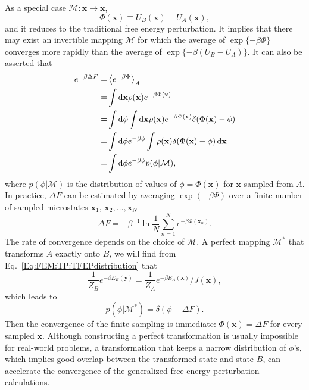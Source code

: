 As a special case $\mathcal{M}: \mathbf{x} \to\mathbf{x}$,
\begin{equation}
	\Phi(\mathbf{x})\equiv U_B(\mathbf{x})-U_A(\mathbf{x}),
\end{equation}
and it reduces to the traditional free energy perturbation. It implies that there may exist an invertible mapping $\mathcal{M}$ for which the average of $\exp\{-\beta \Phi\}$ converges more rapidly than the average of $\exp\{-\beta (U_B-U_A)\}$. It can also be asserted that
\begin{align}
	e^{-\beta \Delta F}=&\left<e^{-\beta \Phi}\right>_A\notag\\
	                =&\int \mathop{}\!\mathrm{d} \mathbf{x} \rho(\mathbf{x})e^{-\beta \Phi(\mathbf{x})}\notag\\
	                =&\int \mathop{}\!\mathrm{d}\phi \int \mathop{}\!\mathrm{d} \mathbf{x} \rho(\mathbf{x})e^{-\beta \Phi(\mathbf{x})}\delta(\Phi(\mathbf{x})-\phi)\notag\\
	                =&\int \mathop{}\!\mathrm{d}\phi e^{-\beta \phi}\int \rho(\mathbf{x})\delta(\Phi(\mathbf{x})-\phi)\mathop{}\!\mathrm{d} \mathbf{x}\notag\\
	                =&\int \mathop{}\!\mathrm{d}\phi e^{-\beta \phi} p(\phi|\mathcal{M}),
\end{align}
where $p(\phi|\mathcal{M})$ is the distribution of values of $\phi=\Phi(\mathbf{x})$ for $\mathbf{x}$ sampled from $A$. In practice, $\Delta F$ can be estimated by averaging $\exp{(-\beta \Phi)}$ over a finite number of sampled microstates $\mathbf{x}_1,\,\mathbf{x}_2,\dots,\mathbf{x}_N$
\begin{equation}
	\Delta F=-\beta^{-1}\ln\frac{1}{N}\sum_{n=1}^N e^{-\beta \Phi(\mathbf{x}_n)}.
\end{equation}
The rate of convergence depends on the choice of $\mathcal{M}$. A perfect mapping $\mathcal{M}^\ast$ that transforms $A$ exactly onto $B$, we will find from Eq.~\ref{Eq:FEM:TP:TFEPdistribution} that
\begin{equation}
	\frac{1}{Z_B}e^{-\beta E_B(\mathbf{y})}=\frac{1}{Z_A}e^{-\beta E_A(\mathbf{x})}/J(\mathbf{x}),
\end{equation}
which leads to
\begin{equation}
	p(\phi|\mathcal{M}^\ast)=\delta (\phi-\Delta F).
\end{equation}
Then the convergence of the finite sampling is immediate: $\Phi(\mathbf{x})=\Delta F$ for every sampled $\mathbf{x}$. Although constructing a perfect transformation is usually impossible for real-world problems, a transformation that keeps a narrow distribution of $\phi$'s, which implies good overlap between the transformed state and state $B$, can accelerate the convergence of the generalized free energy perturbation calculations.

